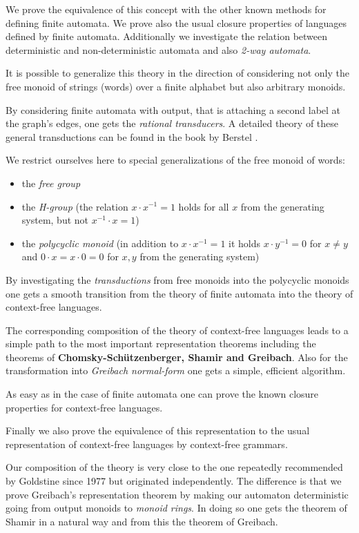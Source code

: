 We prove the equivalence of this concept with the other known methods for
defining finite automata. We prove also the usual closure properties of
languages defined by finite automata. Additionally we investigate the relation
between deterministic and non-deterministic automata and also {\em 2-way
automata}.

It is possible to generalize this theory in the direction of considering not
only the free monoid of strings (words) over a finite alphabet but also
arbitrary monoids.

By considering finite automata with output, that is attaching a second label at
the graph's edges, one gets the {\em rational transducers}. A detailed theory of
these general transductions can be found in the book by Berstel
\cite{Berstel79}.

We restrict ourselves here to special generalizations of the free monoid of
words:
\begin{itemize}
  \item the {\em free group}
  \item the {\em H-group} (the relation $x \cdot x^{-1} = 1$ holds for all $x$
  from the generating system, but not $x^{-1} \cdot x = 1$)
	\item the {\em polycyclic monoid} 
	(in addition to $x \cdot x^{-1} = 1$ it holds $x \cdot y^{-1} = 0$ for $x \neq
	y$ and $0 \cdot x = x \cdot 0 = 0$ for $x,y$ from the generating system)
\end{itemize}

By investigating the {\em transductions} from free monoids into the polycyclic
monoids one gets a smooth transition from the theory of finite automata into
the theory of context-free languages.

The corresponding composition of the theory of context-free languages leads to
a simple path to the most important representation theorems including the
theorems of {\bf Chomsky-Schützenberger, Shamir and Greibach}. Also for the
transformation into {\em Greibach normal-form} one gets a simple, efficient
algorithm.

As easy as in the case of finite automata one can prove the known closure
properties for context-free languages.

Finally we also prove the equivalence of this representation to the
usual representation of context-free languages by context-free grammars.

Our composition of the theory is very close to the one repeatedly recommended by
Goldstine since 1977 but originated independently. The difference is that we
prove Greibach's representation theorem by making our automaton deterministic 
going from output monoids to {\em monoid rings}. In doing so one gets the
theorem of Shamir in a natural way and from this the theorem of Greibach.

